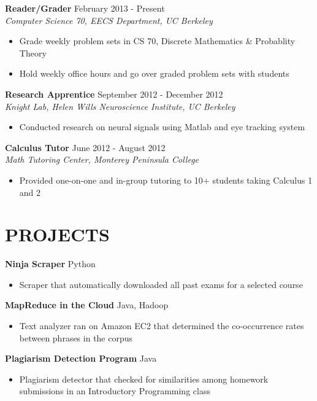\documentclass[margin]{res}
\begin{document}
\begin{resume}
\textbf{Reader/Grader} \hfill February 2013 - Present\\
\textit{Computer Science 70, EECS Department, UC Berkeley} \smallskip
\begin{itemize}[leftmargin=10pt]
\item Grade weekly problem sets in CS 70, Discrete Mathematics \& Probablity Theory
\item Hold weekly office hours and go over graded problem sets with students
\end{itemize}

\textbf{Research Apprentice} \hfill September 2012 - December 2012 \\
\textit{Knight Lab, Helen Wills Neuroscience Institute, UC Berkeley} \smallskip
\begin{itemize}[leftmargin=10pt]
\item Conducted research on neural signals using Matlab and eye tracking system
\end{itemize}

\textbf{Calculus Tutor} \hfill June 2012 - August 2012 \\
\textit{Math Tutoring Center, Monterey Peninsula College} \smallskip
\begin{itemize}[leftmargin=10pt]
\item Provided one-on-one and in-group tutoring to 10+ students taking Calculus 1 and 2
\end{itemize}

\section{PROJECTS} 
\textbf{Ninja Scraper} \hfill Python
\begin{itemize}[leftmargin=10pt]
\itemsep -2pt %
\item Scraper that automatically downloaded all past exams for a selected course
\end{itemize}
            
\textbf{MapReduce in the Cloud} \hfill Java, Hadoop
\begin{itemize}[leftmargin=10pt]
\itemsep -2pt %
\item Text analyzer ran on Amazon EC2 that determined the co-occurrence rates between phrases in the corpus
\end{itemize}

\textbf{Plagiarism Detection Program} \hfill Java
\begin{itemize}[leftmargin=10pt]
\itemsep -2pt %
\item Plagiarism detector that checked for similarities among homework submissions in an Introductory Programming class
\end{itemize}


\end{resume}
\end{document}

